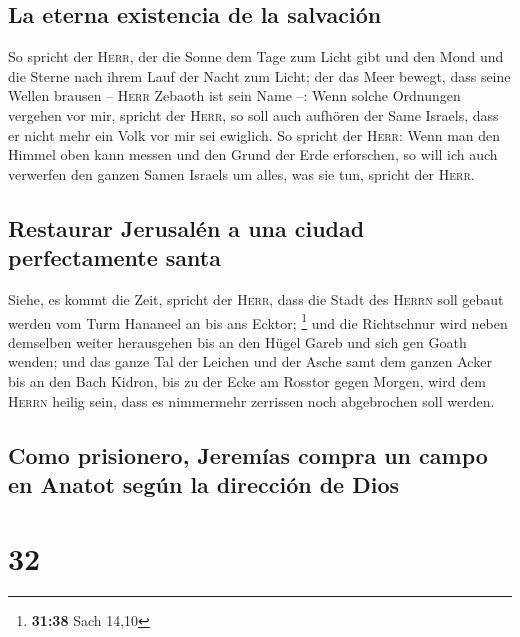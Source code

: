 \hypertarget{la-eterna-existencia-de-la-salvaciuxf3n}{%
\subsection{La eterna existencia de la
salvación}\label{la-eterna-existencia-de-la-salvaciuxf3n}}

 So spricht der \textsc{Herr}, der die Sonne dem Tage zum
Licht gibt und den Mond und die Sterne nach ihrem Lauf der Nacht zum
Licht; der das Meer bewegt, dass seine Wellen brausen -- \textsc{Herr}
Zebaoth ist sein Name --:  Wenn solche Ordnungen vergehen
vor mir, spricht der \textsc{Herr}, so soll auch aufhören der Same
Israels, dass er nicht mehr ein Volk vor mir sei ewiglich.
 So spricht der \textsc{Herr}: Wenn man den Himmel oben
kann messen und den Grund der Erde erforschen, so will ich auch
verwerfen den ganzen Samen Israels um alles, was sie tun, spricht der
\textsc{Herr}.

\hypertarget{restaurar-jerusaluxe9n-a-una-ciudad-perfectamente-santa}{%
\subsection{Restaurar Jerusalén a una ciudad perfectamente
santa}\label{restaurar-jerusaluxe9n-a-una-ciudad-perfectamente-santa}}

 Siehe, es kommt die Zeit, spricht der \textsc{Herr},
dass die Stadt des \textsc{Herrn} soll gebaut werden vom Turm Hananeel
an bis ans Ecktor; \footnote{\textbf{31:38} Sach 14,10} 
und die Richtschnur wird neben demselben weiter herausgehen bis an den
Hügel Gareb und sich gen Goath wenden;  und das ganze Tal
der Leichen und der Asche samt dem ganzen Acker bis an den Bach Kidron,
bis zu der Ecke am Rosstor gegen Morgen, wird dem \textsc{Herrn} heilig
sein, dass es nimmermehr zerrissen noch abgebrochen soll werden.

\hypertarget{como-prisionero-jeremuxedas-compra-un-campo-en-anatot-seguxfan-la-direcciuxf3n-de-dios}{%
\subsection{Como prisionero, Jeremías compra un campo en Anatot según la
dirección de
Dios}\label{como-prisionero-jeremuxedas-compra-un-campo-en-anatot-seguxfan-la-direcciuxf3n-de-dios}}

\hypertarget{section-31}{%
\section{32}\label{section-31}}

